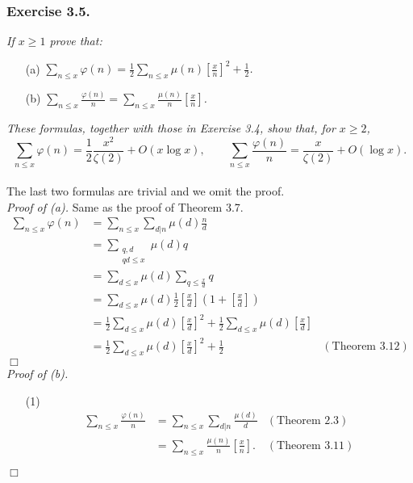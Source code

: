 \documentclass{article}
\begin{document}
\subsubsection*{Exercise 3.5.}
\emph{If $x \geq 1$ prove that:}
\begin{enumerate}
\item[(a)]
  \emph{$\sum_{n \leq x} \varphi(n)
  = \frac{1}{2} \sum_{n \leq x} \mu(n)\left[ \frac{x}{n} \right]^2 + \frac{1}{2}$.}

\item[(b)]
  \emph{$\sum_{n \leq x} \frac{\varphi(n)}{n}
  = \sum_{n \leq x} \frac{\mu(n)}{n}\left[ \frac{x}{n} \right]$.}
\end{enumerate}
\emph{These formulas, together with those in Exercise 3.4, show that, for $x \geq 2$,
\[
  \sum_{n \leq x} \varphi(n)
  = \frac{1}{2} \frac{x^2}{\zeta(2)} + O(x \log x),
  \qquad
  \sum_{n \leq x} \frac{\varphi(n)}{n}
  = \frac{x}{\zeta(2)} + O(\log x).
\]} \\

The last two formulas are trivial and we omit the proof. \\

\emph{Proof of (a).}
  Same as the proof of Theorem 3.7.
  \begin{align*}
    \sum_{n \leq x} \varphi(n)
    &= \sum_{n \leq x} \sum_{d|n} \mu(d) \frac{n}{d} \\
    &= \sum_{\substack{q, d \\ qd \leq x}} \mu(d) q \\
    &= \sum_{d \leq x} \mu(d) \sum_{q \leq \frac{x}{d}} q \\
    &= \sum_{d \leq x}
        \mu(d) \frac{1}{2} \left[\frac{x}{d}\right]\left(1 + \left[\frac{x}{d}\right]\right) \\
    &= \frac{1}{2} \sum_{d \leq x} \mu(d)\left[ \frac{x}{d} \right]^2
        + \frac{1}{2} \sum_{d \leq x} \mu(d)\left[ \frac{x}{d} \right] \\
    &= \frac{1}{2} \sum_{d \leq x} \mu(d)\left[ \frac{x}{d} \right]^2 + \frac{1}{2}
      &(\text{Theorem 3.12})
  \end{align*}
$\Box$ \\



\emph{Proof of (b).}
\begin{enumerate}
\item[(1)]
  \begin{align*}
    \sum_{n \leq x} \frac{\varphi(n)}{n}
    &= \sum_{n \leq x} \sum_{d|n} \frac{\mu(d)}{d}
      &(\text{Theorem 2.3}) \\
    &= \sum_{n \leq x} \frac{\mu(n)}{n} \left[ \frac{x}{n} \right].
      &(\text{Theorem 3.11})
  \end{align*}
\end{enumerate}
$\Box$ \\\\
\end{document}
